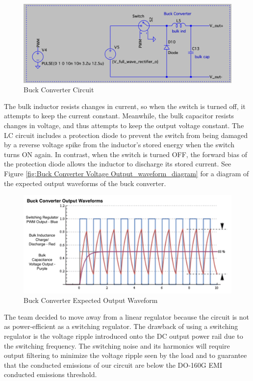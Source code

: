 \documentclass[conference]{IEEEtran}
\begin{document}
\begin{figure}[htp]
    \centering
    \includegraphics[width=1.0\linewidth]{buck_converter_circuit.png}
    \caption{Buck Converter Circuit}
    \label{fig:Buck Converter Voltage Output_circuit_diagram}
\end{figure}

The bulk inductor resists changes in current, so when the switch is turned off, it attempts to keep the current constant. Meanwhile, the bulk capacitor resists changes in voltage, and thus attempts to keep the output voltage constant. The LC circuit includes a protection diode to prevent the switch from being damaged by a reverse voltage spike from the inductor's stored energy when the switch turns ON again. In contrast, when the switch is turned OFF, the forward bias of the protection diode allows the inductor to discharge its stored current. See Figure \ref{fig:Buck Converter Voltage Output_waveform_diagram} for a diagram of the expected output waveforms of the buck converter.

\begin{figure}[htp]
    \centering
    \includegraphics[width=1.0\linewidth]{buck_converter_waveform.png}
    \caption{Buck Converter Expected Output Waveform}
    \label{fig:buck_converter_waveform_diagram}
\end{figure}

The team decided to move away from a linear regulator because the circuit is not as power-efficient as a switching regulator. The drawback of using a switching regulator is the voltage ripple introduced onto the DC output power rail due to the switching frequency. The switching noise and its harmonics will require output filtering to minimize the voltage ripple seen by the load and to guarantee that the conducted emissions of our circuit are below the DO-160G EMI conducted emissions threshold. 
\end{document}
